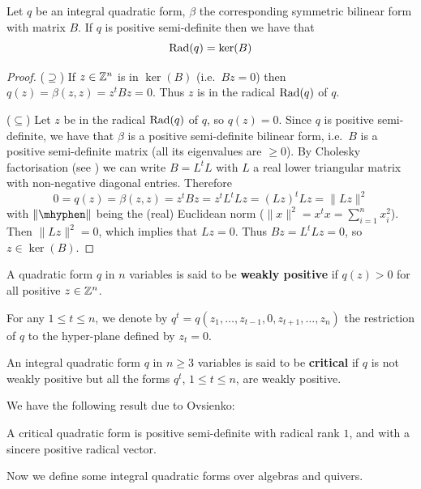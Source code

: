 \begin{lemma}\label{lem:radpossemi}
	Let $q$ be an integral quadratic form, $\beta$ the corresponding symmetric bilinear form with matrix $B$. If $q$ is positive semi-definite then we have that
	\[\operatorname{Rad}(q)=\ker(B)\]
\end{lemma}
\begin{proof}
	($\supseteq$) If $z\in\mathbb{Z}^n$ is in $\ker(B)$ (i.e.~$Bz=0$) then $q(z)=\beta(z,z)=z^t B z = 0$. Thus $z$ is in the radical $\operatorname{Rad}(q)$ of $q$.
	
	($\subseteq$) Let $z$ be in the radical $\operatorname{Rad}(q)$ of $q$, so $q(z)=0$. Since $q$ is positive semi-definite, we have that $\beta$ is a positive semi-definite bilinear form, i.e.~$B$ is a positive semi-definite matrix (all its eigenvalues are $\geq0$). By Cholesky factorisation (see \cite[Corollary 7.2.9]{horn2012matrix}) we can write $B= L^t L$ with $L$ a real lower triangular matrix with non-negative diagonal entries. Therefore
	\[
	0=q(z)=\beta(z,z)=z^t B z= z^t L^t Lz=(Lz)^t Lz = \lVert Lz\rVert ^2
	\]
	with $\lVert\mhyphen\rVert$ being the (real) Euclidean norm ($\lVert x\rVert^2 =x^t x= \sum_{i=1}^{n} x_i^2$). Then $\lVert Lz\rVert ^2=0$, which implies that $Lz=0$. Thus $Bz=L^tLz=0$, so $z\in\ker(B)$.
\end{proof}

\begin{definition}
	A quadratic form $q$ in $n$ variables is said to be \textbf{weakly positive} if $q(z) > 0$ for all positive $z\in\mathbb{Z}^n$.
	
	For any $1\leq t\leq n$, we denote by $q^t= q(z_1,\dots, z_{t-1},0,z_{t+1},\dots,z_n)$ the restriction of $q$ to the hyper-plane defined by $z_t=0$.
	
	An integral quadratic form $q$ in $n\geq 3$ variables is said to be \textbf{critical} if $q$ is not weakly positive but all the
	forms $q^t$, $1\leq t\leq n$, are weakly positive.
\end{definition}

We have the following result due to Ovsienko:
\begin{theorem}\label{thm:criticalform}
	A critical quadratic form is positive semi-definite	with radical rank $1$, and with a sincere positive radical vector.
\end{theorem}

Now we define some integral quadratic forms over algebras and quivers.

